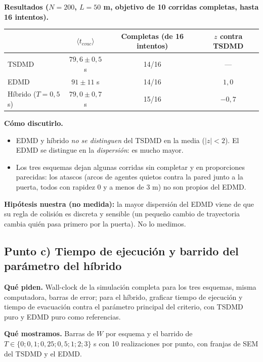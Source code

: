 \documentclass[10.5pt,a4paper]{article}
\newcommand{\hipotesis}[1]{\par\colorbox{hipo}{\parbox{\dimexpr\linewidth-2\fboxsep}{\textbf{Hipótesis nuestra (no medida):} #1}}\par}
\begin{document}
\textbf{Resultados ($N=200$, $L=50$ m, objetivo de 10 corridas completas, hasta 16 intentos).}
\begin{center}\small
\begin{tabular}{@{}lccc@{}}
\toprule
 & $\langle t_{evac}\rangle$ & Completas (de 16 intentos) & $z$ contra TSDMD \\ \midrule
TSDMD & $79{,}6\pm0{,}5$ s & 14/16 & --- \\
EDMD & $91\pm11$ s & 14/16 & $1{,}0$ \\
Híbrido ($T=0{,}5$ s) & $79{,}0\pm0{,}7$ s & 15/16 & $-0{,}7$ \\ \bottomrule
\end{tabular}
\end{center}
\textbf{Cómo discutirlo.}
\begin{itemize}
\item EDMD y híbrido \emph{no se distinguen} del TSDMD en la media ($|z|<2$). El EDMD se distingue en la \emph{dispersión}: es mucho mayor.
\item Los tres esquemas dejan algunas corridas sin completar y en proporciones parecidas: los atascos (arcos de agentes quietos contra la pared junto a la puerta, todos con rapidez 0 y a menos de 3 m) no son propios del EDMD.
\end{itemize}
\hipotesis{la mayor dispersión del EDMD viene de que su regla de colisión es discreta y sensible (un pequeño cambio de trayectoria cambia quién pasa primero por la puerta). No lo medimos.}

\subsection{Punto c) Tiempo de ejecución y barrido del parámetro del híbrido}
\textbf{Qué piden.} Wall-clock de la simulación completa para los tres esquemas, misma computadora, barras de error; para el híbrido, graficar tiempo de ejecución y tiempo de evacuación contra el parámetro principal del criterio, con TSDMD puro y EDMD puro como referencias.

\textbf{Qué mostramos.} Barras de $W$ por esquema y el barrido de $T\in\{0;0{,}1;0{,}25;0{,}5;1;2;3\}$ s con 10 realizaciones por punto, con franjas de SEM del TSDMD y el EDMD.
\end{document}
